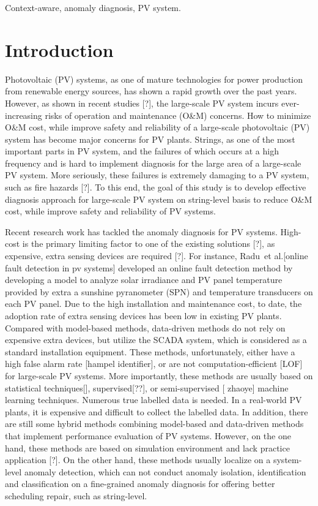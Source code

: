 \documentclass[journal]{IEEEtran}
\makeatletter
\newcommand{\etal}{et al.\@\xspace}
\makeatother
\begin{document}
\begin{keywords}
Context-aware, anomaly diagnosis, PV system.
\end{keywords}


\section{Introduction}
\label{sect::intro}
Photovoltaic (PV) systems, as one of mature technologies for power production from renewable energy sources, has shown a rapid growth over the past years. However, as shown in recent studies [?], the large-scale PV system incurs ever-increasing risks of operation and maintenance (O\&M) concerns. How to minimize O\&M cost, while improve safety and reliability of a large-scale photovoltaic (PV) system has become major concerns for PV plants. Strings, as one of the most important parts in PV system, and the failures of which occurs at a high frequency and is hard to implement diagnosis for the large area of a large-scale PV system. More seriously, these failures is extremely damaging to a PV system, such as fire hazards [?]. To this end, the goal of this study is to develop effective diagnosis approach for large-scale PV system on string-level basis to reduce O\&M cost, while improve safety and reliability of PV systems. 

Recent research work has tackled the anomaly diagnosis for PV systems. High-cost is the primary limiting factor to one of the existing solutions [?], as expensive, extra sensing devices are required [?]. For instance, Radu~\etal [online fault detection in pv systems] developed an online fault detection method by developing a model to analyze solar irradiance and PV panel temperature provided by extra a sunshine pyranometer (SPN) and temperature transducers on each PV panel. Due to the high installation and maintenance cost, to date, the adoption rate of extra sensing devices has been low in existing PV plants. Compared with model-based methods, data-driven methods do not rely on expensive extra devices, but utilize the SCADA system, which is considered as a standard installation equipment. These methods, unfortunately, either have a high false alarm rate [hampel identifier], or are not computation-efficient [LOF] for large-scale PV systems. More importantly, these methods are usually based on statistical techniques[], supervised[??], or semi-supervised [ zhaoye] machine learning techniques. Numerous true labelled data is needed. In a real-world PV plants, it is expensive and difficult to collect the labelled data. In addition, there are still some hybrid methods combining model-based and data-driven methods that implement performance evaluation of PV systems. However, on the one hand, these methods are based on simulation environment and lack practice application [?]. On the other hand, these methods usually localize on a system-level anomaly detection, which can not conduct anomaly isolation, identification and classification on a fine-grained anomaly diagnosis for offering better scheduling repair, such as string-level. 
\end{document}
